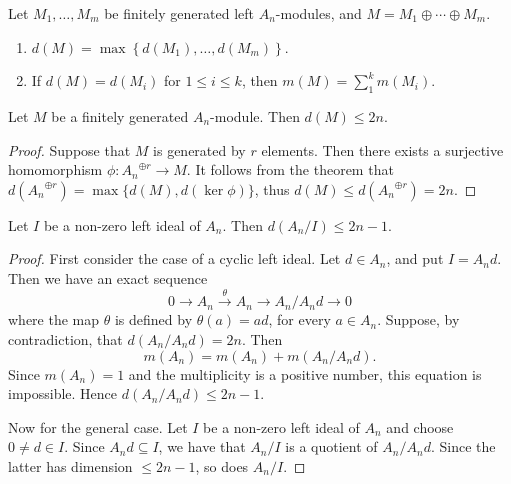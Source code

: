 \documentclass[12pt, oneside]{book}
\begin{document}
\begin{corollary}
    Let $M_1, \ldots, M_m$ be finitely generated left $A_n$-modules, and $M=M_1 \oplus \cdots \oplus M_m$.
    \begin{enumerate}
        \item
              $d(M)=\max \left\{d\left(M_1\right), \ldots, d\left(M_m\right)\right\}$.

        \item
              If $d(M)=d\left(M_i\right)$ for $1 \leq i \leq k$, then $m(M)=\sum_1^k m\left(M_i\right)$.
    \end{enumerate}
\end{corollary}

\begin{corollary}
    Let $M$ be a finitely generated $A_n$-module. Then $d(M) \leq 2 n$.

    \begin{proof}
        Suppose that $M$ is generated by $r$ elements. Then there exists a surjective homomorphism $\phi: {A_n}^{\oplus r} \rightarrow M$. It follows from the theorem that $d\left({A_n}^{\oplus r}\right)=\max \{d(M), d(\operatorname{ker} \phi)\}$, thus $d(M) \leq d\left({A_n}^{\oplus r}\right) = 2 n$.
    \end{proof}
\end{corollary}

\begin{corollary}
    Let $I$ be a non-zero left ideal of $A_n$. Then $d\left(A_n / I\right) \leq 2 n-1$.

    \begin{proof}
        First consider the case of a cyclic left ideal. Let $d \in A_n$, and put $I=A_n d$. Then we have an exact sequence
        \begin{equation*}
            0 \rightarrow A_n \xrightarrow{\theta} A_n \rightarrow A_n / A_n d \rightarrow 0
        \end{equation*}
        where the map $\theta$ is defined by $\theta(a)=a d$, for every $a \in A_n$. Suppose, by contradiction, that $d\left(A_n / A_n d\right)=2 n$. Then
        \begin{equation*}
            m\left(A_n\right)=m\left(A_n\right)+m\left(A_n / A_n d\right) .
        \end{equation*}
        Since $m\left(A_n\right)=1$ and the multiplicity is a positive number, this equation is impossible. Hence $d\left(A_n / A_n d\right) \leq 2 n-1$.

        Now for the general case. Let $I$ be a non-zero left ideal of $A_n$ and choose $0 \neq d \in I$. Since $A_n d \subseteq I$, we have that $A_n / I$ is a quotient of $A_n / A_n d$. Since the latter has dimension $\leq 2 n-1$, so does $A_n / I$.
    \end{proof}
\end{corollary}
\end{document}

